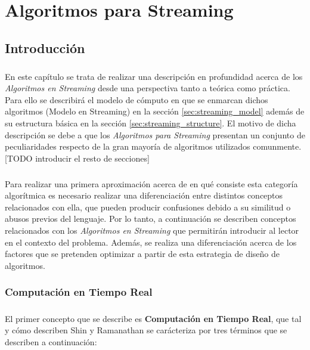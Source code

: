 \documentclass{subfiles}
\begin{document}
  \chapter{Algoritmos para Streaming}
  \label{chapter:streaming}


    \section{Introducción}
    \label{sec:streaming_intro}

      \paragraph{}
      En este capítulo se trata de realizar una descripción en profundidad acerca de los \emph{Algoritmos en Streaming} desde una perspectiva tanto a teórica como práctica. Para ello se describirá el modelo de cómputo en que se enmarcan dichos algoritmos (Modelo en Streaming) en la sección \ref{sec:streaming_model} además de su estructura básica en la sección \ref{sec:streaming_structure}. El motivo de dicha descripción se debe a que los \emph{Algoritmos para Streaming} presentan un conjunto de peculiaridades respecto de la gran mayoría de algoritmos utilizados comunmente. [TODO introducir el resto de secciones]

      \paragraph{}
      Para realizar una primera aproximación acerca de en qué consiste esta categoría algorítmica es necesario realizar una diferenciación entre distintos conceptos relacionados con ella, que pueden producir confusiones debido a su similitud o abusos previos del lenguaje. Por lo tanto, a continuación se describen conceptos relacionados con los \emph{Algoritmos en Streaming} que permitirán introducir al lector en el contexto del problema. Además, se realiza una diferenciación acerca de los factores que se pretenden optimizar a partir de esta estrategia de diseño de algoritmos.


      \subsection{Computación en Tiempo Real}
      \label{sec:realtime_computing}
        \paragraph{}
        El primer concepto que se describe es \textbf{Computación en Tiempo Real}, que tal y cómo describen Shin y Ramanathan \cite{259423} se carácteriza por tres términos que se describen a continuación:
\end{document}
